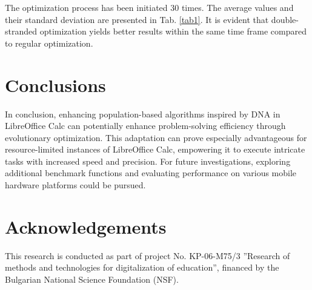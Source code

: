 \documentclass[runningheads]{llncs}
\begin{document}
The optimization process has been initiated 30 times. The average values and their standard deviation are presented in Tab. \ref{tab1}. It is evident that double-stranded optimization yields better results within the same time frame compared to regular optimization.

\section{Conclusions}

In conclusion, enhancing population-based algorithms inspired by DNA in LibreOffice Calc can potentially enhance problem-solving efficiency through evolutionary optimization. This adaptation can prove especially advantageous for resource-limited instances of LibreOffice Calc, empowering it to execute intricate tasks with increased speed and precision. For future investigations, exploring additional benchmark functions and evaluating performance on various mobile hardware platforms could be pursued.

\section*{Acknowledgements} This research is conducted as part of project No. KP-06-M75/3 ''Research of methods and technologies for digitalization of education'', financed by the Bulgarian National Science Foundation (NSF).
\end{document}
